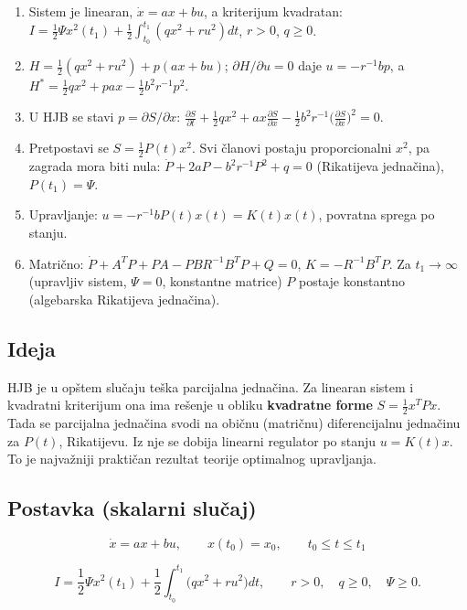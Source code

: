 \documentclass[11pt,a4paper,parskip=half,headsepline,numbers=noenddot]{scrartcl}
\begin{document}
\begin{kljucna}
\begin{enumerate}
\def\labelenumi{\arabic{enumi}.}
\item Sistem je linearan, \(\dot x = ax + bu\), a kriterijum kvadratan: \(I = \frac12\Psi x^2(t_1) + \frac12\int_{t_0}^{t_1}(qx^2 + ru^2)dt\), \(r > 0\), \(q \ge 0\).
\item \(H = \frac12(qx^2 + ru^2) + p(ax + bu)\); \(\partial H/\partial u = 0\) daje \(u = -r^{-1}bp\), a \(H^* = \frac12qx^2 + pax - \frac12b^2r^{-1}p^2\).
\item U HJB se stavi \(p = \partial S/\partial x\): \(\frac{\partial S}{\partial t} + \frac12qx^2 + ax\frac{\partial S}{\partial x} - \frac12b^2r^{-1}\big(\frac{\partial S}{\partial x}\big)^2 = 0\).
\item Pretpostavi se \(S = \frac12P(t)x^2\). Svi članovi postaju proporcionalni \(x^2\), pa zagrada mora biti nula: \(\dot P + 2aP - b^2r^{-1}P^2 + q = 0\) (Rikatijeva jednačina), \(P(t_1) = \Psi\).
\item Upravljanje: \(u = -r^{-1}bP(t)x(t) = K(t)x(t)\), povratna sprega po stanju.
\item Matrično: \(\dot P + A^TP + PA - PBR^{-1}B^TP + Q = 0\), \(K = -R^{-1}B^TP\). Za \(t_1 \to \infty\) (upravljiv sistem, \(\Psi = 0\), konstantne matrice) \(P\) postaje konstantno (algebarska Rikatijeva jednačina).
\end{enumerate}
\end{kljucna}

\subsection{Ideja}

HJB je u opštem slučaju teška parcijalna jednačina. Za linearan sistem i kvadratni kriterijum ona ima rešenje u obliku \textbf{kvadratne forme} \(S = \frac12x^TPx\). Tada se parcijalna jednačina svodi na običnu (matričnu) diferencijalnu jednačinu za \(P(t)\), Rikatijevu. Iz nje se dobija linearni regulator po stanju \(u = K(t)x\). To je najvažniji praktičan rezultat teorije optimalnog upravljanja.

\subsection{Postavka (skalarni slučaj)}

\[\dot x = ax + bu, \qquad x(t_0) = x_0, \qquad t_0 \le t \le t_1\]

\[I = \frac12\Psi x^2(t_1) + \frac12\int_{t_0}^{t_1}\big(qx^2 + ru^2\big)dt, \qquad r > 0, \quad q \ge 0, \quad \Psi \ge 0 .\]
\end{document}
